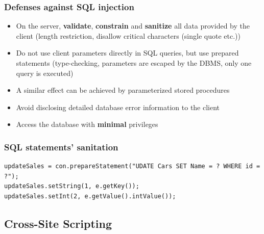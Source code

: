 \documentclass[10pt]{article}
\begin{document}
\subsubsection{Defenses against SQL injection}
\begin{itemize}
	\item On the server, \textbf{validate}, \textbf{constrain} and \textbf{sanitize} all data provided by the client (length restriction, disallow critical characters (single quote etc.))
	\item Do not use client parameters directly in SQL queries, but use prepared statements (type-checking, parameters are escaped by the DBMS, only one query is executed)
	\item A similar effect can be achieved by parameterized stored procedures
	\item Avoid disclosing detailed database error information to the client
	\item Access the database with \textbf{minimal} privileges
\end{itemize}
\subsubsection{SQL statements’ sanitation}
\begin{lstlisting}[caption=PreparedStatement Pseudocode,style=JavaStyle]
updateSales = con.prepareStatement("UDATE Cars SET Name = ? WHERE id = ?");
updateSales.setString(1, e.getKey());
updateSales.setInt(2, e.getValue().intValue());
\end{lstlisting}
\subsection{Cross-Site Scripting}
\end{document}

